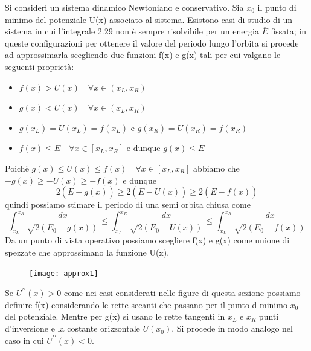 Si consideri un sistema dinamico Newtoniano e conservativo. Sia $x_0$ il punto di minimo del potenziale U(x) associato al sistema. Esistono casi di studio di un sistema in cui l'integrale 2.29 non \`{e} sempre risolvibile per un energia $\overline{E}$ fissata; in queste configurazioni per ottenere il valore del periodo lungo l'orbita si procede ad approssimarla scegliendo due funzioni  f(x) e g(x) tali per cui valgano le seguenti propriet\`{a}:
\begin{itemize}
	\item  $f(x) > U(x) \quad \forall x \in (x_L,x_R)$ 
	\item $g(x) < U(x) \quad \forall x \in (x_L,x_R)$
	\item $g(x_L) = U(x_L) =f(x_L)$ e $g(x_R) = U(x_R) = f(x_R)$
	\item $f(x) \leq  \overline{E} \quad \forall x \in [x_L,x_R]$ e dunque $g(x) \leq \overline{E}$
\end{itemize}

Poich\`{e} $g(x) \leq U(x) \leq f(x) \quad \forall x \in [x_L,x_R]$ abbiamo che $-g(x) \geq -U(x) \geq -f(x)$ e dunque 
\begin{equation*}
	2(\overline{E}  - g(x)) \geq 2(\overline{E} - U(x)) \geq 2(\overline{E}-f(x))
\end{equation*}
quindi possiamo stimare il periodo di una semi orbita chiusa come
\begin{equation*}
	\int_{x_L}^{x_R} \frac{dx}{\sqrt{2(E_0 -g(x))}} \leq \int_{x_L}^{x_R} \frac{dx}{\sqrt{2(E_0 -U(x))}} \leq \int_{x_L}^{x_R} \frac{dx}{\sqrt{2(E_0 -f(x))}}
\end{equation*}
Da un punto di vista operativo possiamo scegliere f(x) e g(x) come unione di spezzate che approssimano la funzione U(x).

\begin{figure}
\vspace{-0.6in}
  \begin{center}
    \texttt{[image: approx1]}
  \end{center}
\end{figure}
\vspace{0.3in}
\noindent Se $U^{\prime \prime}(x) > 0 $ come nei casi considerati nelle figure di questa sezione possiamo definire f(x) considerando le rette secanti che passano per il punto d minimo $x_0$ del potenziale. Mentre per g(x) si usano le rette tangenti in $x_L$ e $x_R$ punti d'inversione e la costante orizzontale $U(x_0)$. Si procede in modo analogo nel caso in cui $U^{\prime \prime} (x) < 0$. 

